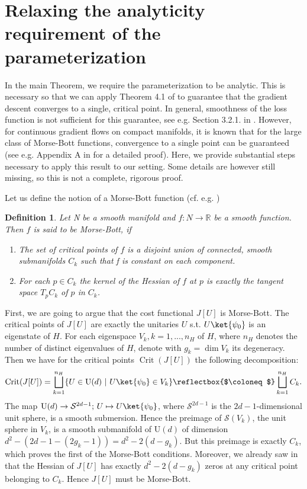 \documentclass{article}
\newtheorem{definition}{Definition}
\begin{document}
\section{Relaxing the analyticity requirement of the parameterization}
\label{sec:morse-bott}
In the main Theorem, we require the parameterization to be analytic.
This is necessary so that we can apply Theorem 4.1 of \cite{absil_convergence_2005} to guarantee that the gradient descent converges to a single, critical point.
In general, smoothness of the loss function is not sufficient for this guarantee, see e.g. Section 3.2.1. in \cite{absil_convergence_2005}.
However, for continuous gradient flows on compact manifolds, it is known that for the large class of Morse-Bott functions, convergence to a single point can be guaranteed (see e.g. Appendix A in \cite{marinkovic_symplectic_2022} for a detailed proof).
Here, we provide substantial steps necessary to apply this result to our setting.
Some details are however still missing, so this is not a complete, rigorous proof.

Let us define the notion of a Morse-Bott function (cf. e.g. \cite{banyaga_proof_2004})
\begin{definition}
    Let N be a smooth manifold and \(f: N \to \mathds{R}\) be a smooth function.
    Then \(f\) is said to be Morse-Bott, if
    \begin{enumerate}
        \item The set of critical points of \(f\) is a disjoint union of connected, smooth submanifolds \(C_k\) such that f is constant on each component.
        \item For each \(p \in C_k\) the kernel of the Hessian of \(f\) at \(p\) is exactly the tangent space \(T_pC_k\) of \(p\) in \(C_k\).
    \end{enumerate}
\end{definition}
First, we are going to argue that the cost functional \(J[U]\) is Morse-Bott.
The critical points of \(J[U]\) are exactly the unitaries \(U\) s.t. \(U\ket{\psi_0}\) is an eigenstate of \(H\).
For each eigenspace \(V_k, k=1,...,n_H\) of \(H\), where \(n_H\) denotes the number of distinct eigenvalues of \(H\), denote with \(g_k = \operatorname{dim} V_k\) its degeneracy.
Then we have for the critical points \(\operatorname{Crit }(J[U])\) the following decomposition:
\begin{equation}
    \operatorname{Crit}(J[U])= \bigsqcup_{k=1}^{n_H} \{U \in \mathrm{U}(d) \ | \ U\ket{\psi_0} \in V_k\} \text{\reflectbox{$\coloneq$}} \bigsqcup_{k=1}^{n_H} C_k.
\end{equation}
The map \(\mathrm{U}(d) \to \mathcal{S}^{2d-1} \text{; } U \mapsto U \ket{\psi_0}\), where \(\mathcal{S}^{2d-1}\) is the \(2d-1\)-dimensional unit sphere, is a smooth submersion.
Hence the preimage of \(\mathcal{S}(V_k)\), the unit sphere in \(V_k\), is a smooth submanifold of \(\mathrm{U}(d)\) of dimension \(d^2 - (2d-1 - (2g_k-1)) = d^2-2(d-g_k)\).
But this preimage is exactly \(C_k\), which proves the first of the Morse-Bott conditions.
Moreover, we already saw in  that the Hessian of \(J[U]\) has exactly \(d^2 - 2(d-g_k)\) zeros at any critical point belonging to \(C_k\).
Hence \(J[U]\) must be Morse-Bott.
\end{document}
